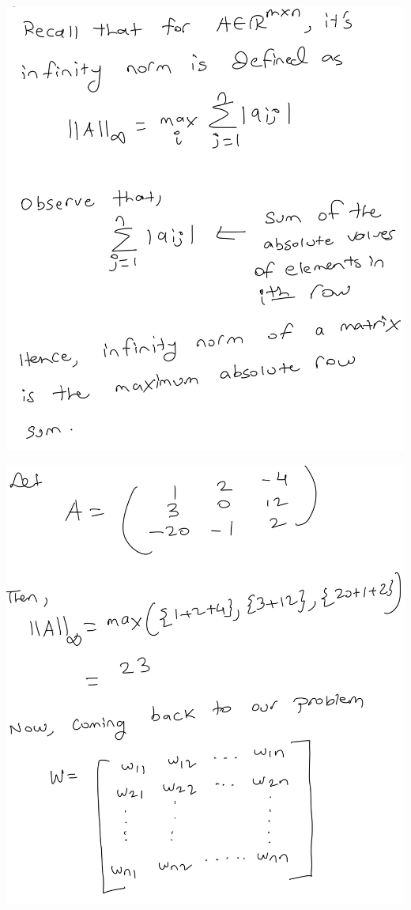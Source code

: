 \documentclass{article}
\begin{document}
\begin{minipage}{2.6in}
\includegraphics[scale=0.22]{d51.png}
\end{minipage}
\begin{minipage}{2.6in}
\includegraphics[scale=0.22]{d52.png}
\end{minipage}
\end{document}
